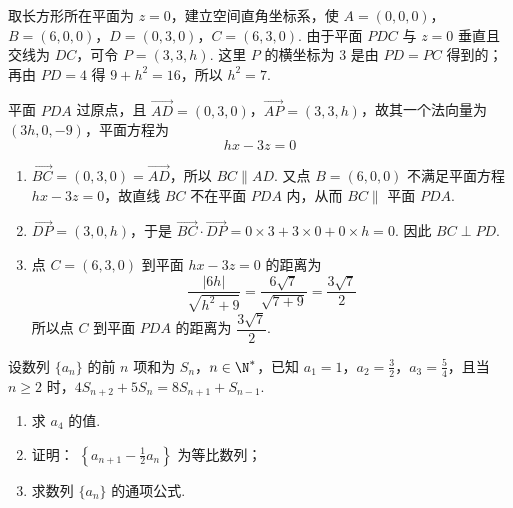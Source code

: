 \begin{solution}
取长方形所在平面为 \(z=0\)，建立空间直角坐标系，使 \(A=(0,0,0)\)，\(B=(6,0,0)\)，\(D=(0,3,0)\)，\(C=(6,3,0)\). 由于平面 \(PDC\) 与 \(z=0\) 垂直且交线为 \(DC\)，可令 \(P=(3,3,h)\). 这里 \(P\) 的横坐标为 3 是由 \(PD=PC\) 得到的；再由 \(PD=4\) 得 \(9+h^2=16\)，所以 \(h^2=7\).

平面 \(PDA\) 过原点，且 \(\overrightarrow{AD}=(0,3,0)\)，\(\overrightarrow{AP}=(3,3,h)\)，故其一个法向量为 \((3h,0,-9)\)，平面方程为
\[
hx-3z=0
\]

\begin{enumerate}
\item \(\overrightarrow{BC}=(0,3,0)=\overrightarrow{AD}\)，所以 \(BC\parallel AD\). 又点 \(B=(6,0,0)\) 不满足平面方程 \(hx-3z=0\)，故直线 \(BC\) 不在平面 \(PDA\) 内，从而 \(BC\parallel\) 平面 \(PDA\).

\item \(\overrightarrow{DP}=(3,0,h)\)，于是 \(\overrightarrow{BC}\cdot\overrightarrow{DP}=0\times3+3\times0+0\times h=0\). 因此 \(BC\perp PD\).

\item 点 \(C=(6,3,0)\) 到平面 \(hx-3z=0\) 的距离为
\[
\frac{|6h|}{\sqrt{h^2+9}}=\frac{6\sqrt7}{\sqrt{7+9}}=\frac{3\sqrt7}{2}
\]
所以点 \(C\) 到平面 \(PDA\) 的距离为 \(\dfrac{3\sqrt7}{2}\).
\end{enumerate}
\end{solution}

\begin{problem}
设数列 \(\{a_{n}\}\) 的前 \(n\) 项和为 \(S_{n}\)，\(n \in \N^{*}\)，已知 \(a_{1} = 1\)，\(a_{2} = \frac{3}{2}\)，\(a_{3} = \frac{5}{4}\)，且当 \(n \geqslant 2\) 时，\(4S_{n+2} + 5S_{n} = 8S_{n+1} + S_{n-1}\).
\begin{enumerate}
\item 求 \( a_{4} \) 的值.
\item 证明： \( \left\{a_{n+1}-\frac{1}{2}a_{n}\right\} \) 为等比数列；
\item 求数列 \( \{a_{n}\} \) 的通项公式.
\end{enumerate}
\end{problem}

